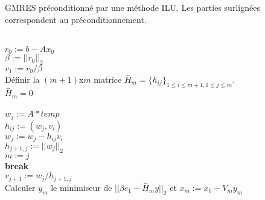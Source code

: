 \begin{algorithm}
  \caption{GMRES préconditionné par une méthode ILU. Les parties surlignées correspondent au préconditionnement.}
  \label{algo:gmres_precond}
   \\
  $r_0 := b - Ax_0$ \\
  $\beta := ||r_0||_2$ \\
  $v_1 := r_0/\beta$ \\
  Définir la $(m + 1)$x$m$ matrice $\overset{-}{H}_m = \{h_{ij}\}_{1 \leq i \leq m+1, 1 \leq j \leq m}$.  \\
  $\overset{-}{H}_m = 0$ \\
   {
     \\
    $w_j := A * temp$\\
     {
      $h_{ij} := (w_j, v_i)$ \\
      $w_j := w_j - h_{ij}v_i$ \\
    }
    $h_{j+1,j} := ||w_j||_2$ \\
     {
      $m := j$ \\
      \textbf{break} \\
    }
    $v_{j+1} := w_j/h_{j+1,j}$ \\
  }
  Calculer $y_m$ le minimiseur de $||\beta{}e_1 - \overset{-}{H}_my||_2$ et $x_m := x_0 + V_my_m$
\end{algorithm}
